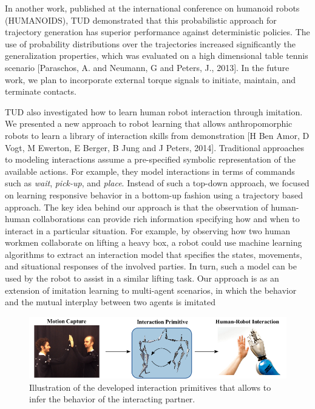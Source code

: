 \documentclass[12pt,a4paper,twoside]{article}
\begin{document}
In another work, published at the international conference on humanoid robots (HUMANOIDS), 
TUD demonstrated that this probabilistic approach for trajectory generation
has superior performance against deterministic policies. The use of
probability distributions over the trajectories increased significantly
 the generalization properties, which was evaluated on a high dimensional table
tennis scenario [Paraschos, A. and  Neumann, G and  Peters, J., 2013]. 
In the future work, we plan to incorporate external torque signals to initiate, 
maintain, and terminate contacts.

TUD also investigated how to learn human robot interaction through imitation. We presented a new approach to robot learning that allows anthropomorphic robots to learn a library of interaction skills from demonstration [H Ben Amor, D Vogt, M Ewerton, E Berger, B Jung and J Peters, 2014]. Traditional approaches to modeling interactions assume a pre-specified symbolic representation of the available actions. For example, they model interactions
in terms of commands such as \emph{wait}, \emph{pick-up}, and \emph{place}. Instead of such a top-down approach, we focused on learning responsive behavior in a bottom-up fashion using a trajectory based approach. The key idea behind our approach is that the observation of human-human collaborations can provide rich information specifying how and when to interact
in a particular situation. For example, by observing how two human workmen collaborate on lifting a heavy box, a robot could use machine learning algorithms to extract an
interaction model that specifies the states, movements, and situational responses of the involved parties. In turn, such a model can be used by the robot to assist in a similar lifting task. Our approach is as an extension of imitation learning to multi-agent scenarios, in which the behavior and the mutual interplay between two agents is imitated

\begin{figure}[!ht]
\centering
\includegraphics[width=\textwidth]{./images/newoverview.png}
 \caption{Illustration of the developed interaction primitives that allows to infer the behavior of the interacting partner.
}
\label{fig:interaction_primitives}
\end{figure}
\end{document}
